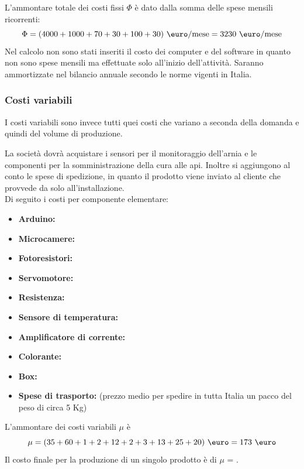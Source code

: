 L’ammontare totale dei costi fissi $\Phi$ è dato dalla somma delle spese mensili
ricorrenti:
\begin{displaymath}
\Phi = (4000 + 1000 + 70 + 30 + 100 + 30) \ \mbox{\euro/mese} = 3230 \ 
\mbox{\euro/mese}
\end{displaymath}
Nel calcolo non sono stati inseriti il costo dei computer e del software in
quanto non sono spese mensili ma effettuate solo all’inizio dell’attività.
Saranno ammortizzate nel bilancio annuale secondo le norme vigenti in Italia.
%
\subsubsection{Costi variabili}
I costi variabili sono invece tutti quei costi che variano a seconda della
domanda e quindi del volume di produzione.

La società dovrà acquistare i sensori per il monitoraggio dell’arnia e le
componenti per la somministrazione della cura alle api. Inoltre si aggiungono al
conto le spese di spedizione, in quanto il prodotto viene inviato al cliente che
provvede da solo all’installazione.\\
%
Di seguito i costi per componente elementare:
\begin{itemize}
\item \textbf{Arduino: }
\item \textbf{Microcamere: }
\item \textbf{Fotoresistori: }
\item \textbf{Servomotore: }
\item \textbf{Resistenza: }
\item \textbf{Sensore di temperatura: }
\item \textbf{Amplificatore di corrente: }
\item \textbf{Colorante: }
\item \textbf{Box: }
\item \textbf{Spese di trasporto: } (prezzo medio per spedire in tutta
Italia un pacco del peso di circa 5 Kg)
\end{itemize}
L’ammontare dei costi variabili $\mu$ è
\begin{displaymath}
\mu= (35 + 60 + 1 + 2 + 12 + 2 + 3 + 13 + 25 + 20) \ \mbox{\euro} = 173
\ \mbox{\euro}
\end{displaymath}
Il costo finale per la produzione di un singolo prodotto è di $\mu$ = .
